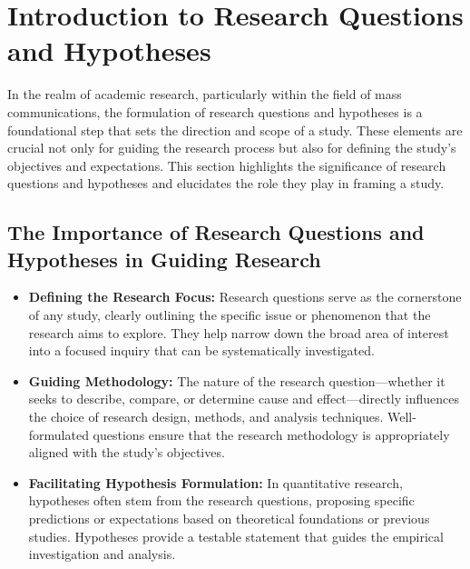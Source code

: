 \documentclass[
]{book}
\begin{document}
\hypertarget{introduction-to-research-questions-and-hypotheses}{%
\section{Introduction to Research Questions and Hypotheses}\label{introduction-to-research-questions-and-hypotheses}}

In the realm of academic research, particularly within the field of mass communications, the formulation of research questions and hypotheses is a foundational step that sets the direction and scope of a study. These elements are crucial not only for guiding the research process but also for defining the study's objectives and expectations. This section highlights the significance of research questions and hypotheses and elucidates the role they play in framing a study.

\hypertarget{the-importance-of-research-questions-and-hypotheses-in-guiding-research}{%
\subsection*{The Importance of Research Questions and Hypotheses in Guiding Research}\label{the-importance-of-research-questions-and-hypotheses-in-guiding-research}}

\begin{itemize}
\item
  \textbf{Defining the Research Focus:} Research questions serve as the cornerstone of any study, clearly outlining the specific issue or phenomenon that the research aims to explore. They help narrow down the broad area of interest into a focused inquiry that can be systematically investigated.
\item
  \textbf{Guiding Methodology:} The nature of the research question---whether it seeks to describe, compare, or determine cause and effect---directly influences the choice of research design, methods, and analysis techniques. Well-formulated questions ensure that the research methodology is appropriately aligned with the study's objectives.
\item
  \textbf{Facilitating Hypothesis Formulation:} In quantitative research, hypotheses often stem from the research questions, proposing specific predictions or expectations based on theoretical foundations or previous studies. Hypotheses provide a testable statement that guides the empirical investigation and analysis.
\end{itemize}
\end{document}

